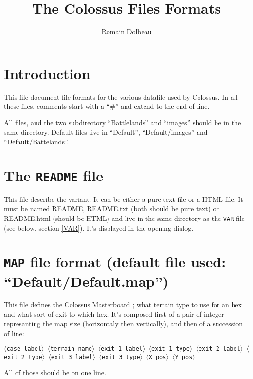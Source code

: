 \documentclass{article}
\begin{document}

\title{The Colossus Files Formats}

\author{Romain Dolbeau}

\maketitle


\section* {Introduction}

This file document file formats for the various datafile used by Colossus. In all these files, comments start with a ``\#'' and extend to the end-of-line.

All files, and the two subdirectory ``Battlelands'' and ``images'' should be in the same directory. Default files live in ``Default'', ``Default/images'' and ``Default/Battelands''.

\section {The \texttt{README} file}

This file describe the variant. It can be either a pure text file or a HTML file. It must be named README, README.txt (both should be pure text) or README.html (should  be HTML) and live in the same directory as the \texttt{VAR} file (see below, section \ref{VAR}). It's displayed in the opening dialog.

\section {\texttt{MAP} file format (default file used: ``Default/Default.map'')}

This file defines the Colossus Masterboard ; what terrain type to use for an hex and what sort of exit to which hex. It's composed first of a pair of integer represanting the map size (horizontaly then vertically), and then of a succession of line:

\texttt{$\langle$case\_label$\rangle$ $\langle$terrain\_name$\rangle$
 $\langle$exit\_1\_label$\rangle$ $\langle$exit\_1\_type$\rangle$
 $\langle$exit\_2\_label$\rangle$ $\langle$exit\_2\_type$\rangle$
 $\langle$exit\_3\_label$\rangle$ $\langle$exit\_3\_type$\rangle$
 $\langle$X\_pos$\rangle$ $\langle$Y\_pos$\rangle$}

All of those should be on one line.
\end{document}
